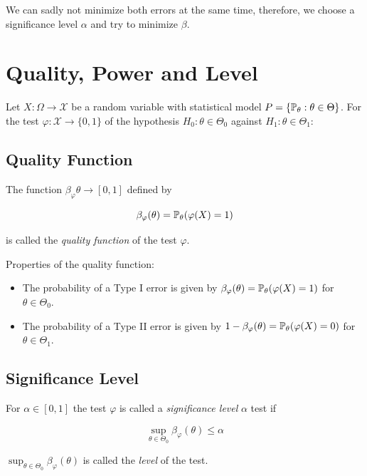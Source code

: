 We can sadly not minimize both errors at the same time, therefore, we choose a significance level \(\alpha\)
and try to minimize \(\beta\).

\section{Quality, Power and Level}

Let \(X: \Omega \to \mathcal{X}\) be a random variable with statistical model \(P = \{\mathbb{P}_\theta : \theta \in \Theta\}\).
For the test \(\varphi: \mathcal{X} \to \{0,1\}\) of the hypothesis \(H_0: \theta \in \Theta_0\) against \(H_1: \theta \in \Theta_1\): 

\subsection{Quality Function}

The function \(\beta_{\varphi} \theta \to [0,1]\) defined by 

\[
    \beta_{\varphi}(\theta) = \mathbb{P}_{\theta}(\varphi(X) = 1) 
\]

is called the \emph{quality function} of the test \(\varphi\).

Properties of the quality function: 

\begin{itemize}

    \item The probability of a Type I error is given by \(\beta_\varphi (\theta) = \mathbb{P}_{\theta}(\varphi(X) = 1)\) for \(\theta \in \Theta_0\).

    \item The probability of a Type II error is given by \(1 - \beta_\varphi (\theta) = \mathbb{P}_{\theta}(\varphi(X) = 0)\) for \(\theta \in \Theta_1\).
   
\end{itemize}

\subsection{Significance Level}

For \(\alpha \in [0,1]\) the test \(\varphi\) is called a \emph{significance level} \(\alpha\) test if 

\[
    \sup_{\theta \in \Theta_0} \beta_{\varphi}(\theta) \le \alpha
\]

\(\sup_{\theta \in \Theta_0} \beta_\varphi (\theta)\) is called the \emph{level} of the test.
    

